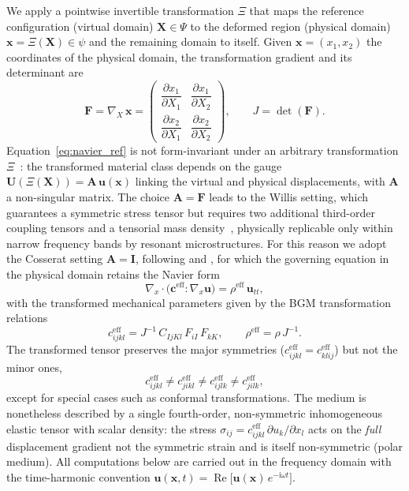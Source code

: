 \documentclass[preprint,12pt]{elsarticle}
\newcommand{\mbf}[1]{\mathbf{#1}}
\newcommand{\be}{\begin{equation}}
\newcommand{\ee}{\end{equation}}
\begin{document}
We apply a pointwise invertible transformation $\Xi$ that maps the
reference configuration (virtual domain) $\mbf{X}\in\Psi$ to the
deformed region (physical domain) $\mbf{x}=\Xi(\mbf{X})\in\psi$ and the
remaining domain to itself. Given $\mbf{x}=(x_1,x_2)$ the coordinates
of the physical domain, the transformation gradient and its determinant
are
\be\label{eq:Fgrad}
  \mbf{F} = \nabla_{\!X}\,\mbf{x}
  =
  \begin{pmatrix}
    \dfrac{\partial x_1}{\partial X_1} & \dfrac{\partial x_1}{\partial X_2} \\[2mm]
    \dfrac{\partial x_2}{\partial X_1} & \dfrac{\partial x_2}{\partial X_2}
  \end{pmatrix},
  \qquad
  J = \det(\mbf{F}).
\ee
Equation~\eqref{eq:navier_ref} is not form-invariant under an arbitrary
transformation $\Xi$~\citep{milton2006}: the transformed material class
depends on the gauge $\mbf{U}(\Xi(\mbf{X}))=\mbf{A}\,\mbf{u}(\mbf{x})$
linking the virtual and physical displacements, with $\mbf{A}$ a
non-singular matrix. The choice $\mbf{A}=\mbf{F}$ leads to the Willis
setting, which guarantees a symmetric stress tensor but requires two
additional third-order coupling tensors and a tensorial mass
density~\citep{milton2006,norris2011,willis1981}, physically replicable
only within narrow frequency bands by resonant microstructures. For
this reason we adopt the Cosserat setting $\mbf{A}=\mbf{I}$, following
\citet{norris2011} and \citet{brun2009}, for which the governing
equation in the physical domain retains the Navier form
\be\label{eq:navier}
  \nabla_{\!x}\cdot\bigl(\mbf{c}^{\mathrm{eff}}:\nabla_{\!x}\mbf{u}\bigr)
  = \rho^{\mathrm{eff}}\,\mbf{u}_{tt},
\ee
with the transformed mechanical parameters given by the BGM transformation relations
\be\label{eq:pushforward}
  c^{\mathrm{eff}}_{ijkl} = J^{-1}\,C_{IjKl}\,F_{iI}\,F_{kK},
  \qquad
  \rho^{\mathrm{eff}} = \rho\,J^{-1}.
\ee
The transformed tensor preserves the major symmetries
($c^{\mathrm{eff}}_{ijkl}=c^{\mathrm{eff}}_{klij}$) but not the minor
ones,
\be\label{eq:broken_minor}
  c^{\mathrm{eff}}_{ijkl}
  \neq c^{\mathrm{eff}}_{jikl}
  \neq c^{\mathrm{eff}}_{ijlk}
  \neq c^{\mathrm{eff}}_{jilk},
\ee
except for special cases such as conformal transformations. The medium
is nonetheless described by a single fourth-order, non-symmetric inhomogeneous elastic tensor with scalar density: the
stress $\sigma_{ij}=c^{\mathrm{eff}}_{ijkl}\,\partial u_k/\partial x_l$
acts on the \emph{full} displacement gradient not the symmetric
strain and is itself non-symmetric (polar medium). All computations
below are carried out in the frequency domain with the time-harmonic
convention
$\mbf{u}(\mbf{x},t)=\operatorname{Re}\bigl[\mbf{u}(\mbf{x})\,e^{-\mathrm{i}\omega t}\bigr]$.
\end{document}

